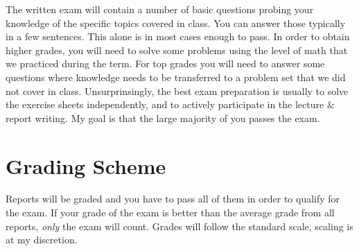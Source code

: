 \documentclass[letterpaper]{inzane_syllabus} %
\begin{document}
The written exam will contain a number of basic questions probing your knowledge of the specific topics covered in class. You can answer those typically in a few sentences. This alone is in most cases enough to pass. In order to obtain higher grades, you will need to solve some problems using the level of math that we practiced during the term. For top grades you will need to answer some questions where knowledge needs to be transferred to a problem set that we did not cover in class. Unsurprinsingly, the best exam preparation is usually to solve the exercise sheets independently, and to actively participate in the lecture \& report writing. My goal is that the large majority of you passes the exam.

\section{Grading Scheme}

\begin{twentyshort}
\end{twentyshort}

Reports will be graded and you have to pass all of them in order to qualify for the exam. If your  grade of the exam is better than the average grade from all reports, \textit{only} the exam will count. Grades will follow the standard scale, scaling is at my discretion.



\newpage
\end{document}

